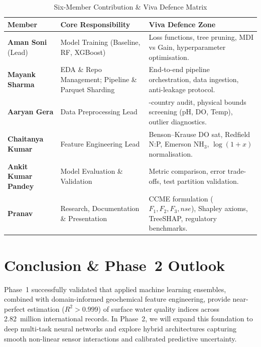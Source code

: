 \documentclass[conference]{IEEEtran}
\begin{document}
\begin{table}[!t]
  \caption{Six-Member Contribution \& Viva Defence Matrix}
  \label{tab:team_contributions}
  \centering
  \setlength{\tabcolsep}{3pt}
  \begin{tabular}{>{\raggedright\arraybackslash}p{1.6cm}>{\raggedright\arraybackslash}p{2.6cm}>{\raggedright\arraybackslash}p{3.8cm}}
    \toprule
    \textbf{Member}
      & \textbf{Core Responsibility}
      & \textbf{Viva Defence Zone} \\
    \midrule
    \textbf{Aman Soni} (Lead)
      & Model Training (Baseline, RF, XGBoost)
      & Loss functions, tree pruning, MDI vs Gain,
        hyperparameter optimisation. \\
    \midrule
    \textbf{Mayank Sharma}
      & EDA \& Repo Management; Pipeline \& Parquet Sharding
      & End-to-end pipeline orchestration, data ingestion,
        anti-leakage protocol. \\
    \midrule
    \textbf{Aaryan Gera}
      & Data Preprocessing Lead
      & 5-country audit, physical bounds screening (pH, DO, Temp),
        outlier diagnostics. \\
    \midrule
    \textbf{Chaitanya Kumar}
      & Feature Engineering Lead
      & Benson--Krause DO sat, Redfield N:P, Emerson NH$_3$,
        $\log(1{+}x)$ normalisation. \\
    \midrule
    \textbf{Ankit Kumar Pandey}
      & Model Evaluation \& Validation
      & Metric comparison, error trade-offs, test partition
        validation. \\
    \midrule
    \textbf{Pranav}
      & Research, Documentation \& Presentation
      & CCME formulation ($F_1, F_2, F_3, nse$), Shapley axioms,
        TreeSHAP, regulatory benchmarks. \\
    \bottomrule
  \end{tabular}
\end{table}

\section{Conclusion \& Phase~2 Outlook}
\label{sec:conclusion}

Phase~1 successfully validated that applied machine learning ensembles,
combined with domain-informed geochemical feature engineering, provide
near-perfect estimation ($R^2 > 0.999$) of surface water quality indices
across 2.82~million international records. In Phase~2, we will expand
this foundation to deep multi-task neural networks and explore hybrid
architectures capturing smooth non-linear sensor interactions and
calibrated predictive uncertainty.

\balance


\end{document}
